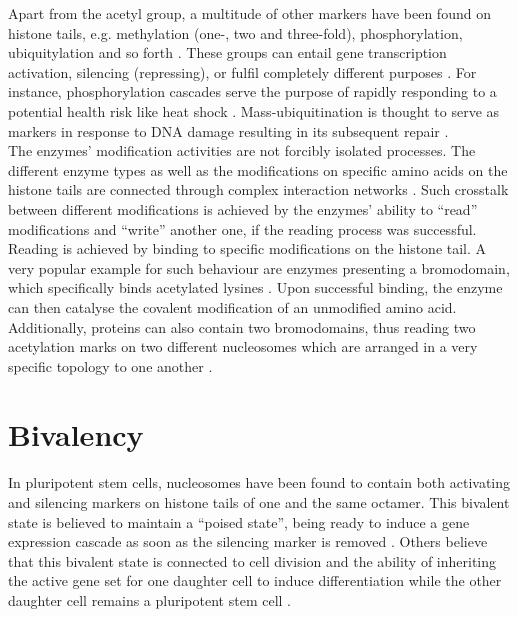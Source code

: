         Apart from the acetyl group, a multitude of other markers have been found on histone tails, e.g. methylation (one-, two and three-fold), phosphorylation, ubiquitylation and so forth \cite{bannister2011regulation}. These groups can entail gene transcription activation, silencing (repressing), or fulfil completely different purposes \cite{rossetto2012histone,wang2006histone}. For instance, phosphorylation cascades serve the purpose of rapidly responding to a potential health risk like heat shock \cite{prohaska2010innovation}. Mass-ubiquitination is thought to serve as markers in response to DNA damage resulting in its subsequent repair \cite{zhou2009histone}.\\

        The enzymes' modification activities are not forcibly isolated processes. The different enzyme types as well as the modifications on specific amino acids on the histone tails are connected through complex interaction networks \cite{zhang2015interplay, musselman2012perceiving, ge2019nucleation}. Such crosstalk between different modifications is achieved by the enzymes' ability to “read” modifications and “write” another one, if the reading process was successful. Reading is achieved by binding to specific modifications on the histone tail. A very popular example for such behaviour are enzymes presenting a bromodomain, which specifically binds acetylated lysines \cite{zeng2002bromodomain}. Upon successful binding, the enzyme can then catalyse the covalent modification of an unmodified amino acid. Additionally, proteins can also contain two bromodomains, thus reading two acetylation marks on two different nucleosomes which are arranged in a very specific topology to one another \cite{prohaska2010innovation}.
    \section{Bivalency}
        \label{sec:TheoryBivalency}
        In pluripotent stem cells, nucleosomes have been found to contain both activating and silencing markers on histone tails of one and the same octamer. This bivalent state is believed to maintain a “poised state”, being ready to induce a gene expression cascade as soon as the silencing marker is removed \cite{lesch2014poised,bernhart2016changes}.
        Others believe that this bivalent state is connected to cell division and the ability of inheriting the active gene set for one daughter cell to induce differentiation while the other daughter cell remains a pluripotent stem cell \cite{schuettengruber2017genome}.

